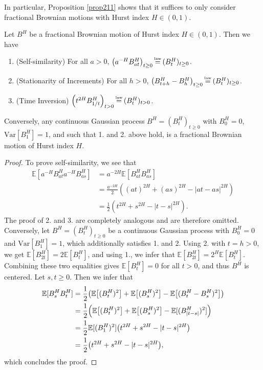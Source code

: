 In particular, Proposition \ref{prop211} shows that it suffices to only consider fractional Brownian motions with Hurst index $H\in (0,1)$.
 \begin{prop}\label{prop212}
     Let $B^{H}$ be a fractional Brownian motion of Hurst index $H\in (0,1)$. Then we have
     \begin{enumerate}
         \item (Self-similarity) For all $a>0$, $\left(a^{-H}B^{H}_{at}\right)_{t\geq 0}\mylaw(B_{t}^{H})_{t\geq 0}$.
         \item (Stationarity of Increments) For all $h>0$, $\left(B_{t+h}^{H}-B_{h}^{H}\right)_{t\geq 0}\mylaw (B_{t}^{H})_{t\geq 0}$.
         \item (Time Inversion) $\left(t^{2H}B^{H}_{1/t}\right)_{t>0}\mylaw (B_{t}^{H})_{t>0}$.
     \end{enumerate}
     Conversely, any continuous Gaussian process $B^{H}=(B_{t}^{H})_{t\geq 0}$ with $B_{0}^{H}=0$, $\textrm{Var}[B_{1}^{H}]=1$, and such that 1. and 2. above hold, is a fractional Brownian motion of Hurst index $H$.
 \end{prop}
 \begin{proof}
 To prove self-similarity, we see that
     \begin{align}
         \mathbb{E}\left[a^{-H}B_{at}^{H}a^{-H}B_{as}^{H}\right]&=a^{-2H}\mathbb{E}[B_{at}^{H}B_{as}^{H}]\\
         &=\frac{a^{-2H}}{2}\left((at)^{2H}+(as)^{2H}-|at-as|^{2H}\right)\\
         &= \frac{1}{2}(t^{2H}+s^{2H}-|t-s|^{2H}).
     \end{align}
     The proof of 2. and 3. are completely analogous and are therefore omitted. Conversely, let $B^{H}=(B_{t}^{H})_{t\geq 0}$ be a continuous Gaussian process with $B^{H}_{0}=0$ and $\textrm{Var}[B_{1}^{H}]=1$, which additionally satisfies 1. and 2. Using 2. with $t=h>0$, we get $\mathbb{E}[B_{2t}^{H}]=2\mathbb{E}[B_{t}^{H}]$, and using 1., we infer that $\mathbb{E}[B_{2t}^{H}]=2^{H}\mathbb{E}[B_{t}^{H}]$. Combining these two equalities gives $\mathbb{E}[B_{t}^{H}]=0$ for all $t>0$, and thus $B^{H}$ is centered. Let $s,t\geq 0$. Then we infer that
     \begin{align}
         \E[B_{s}^{H}B_{t}^{H}]&=\frac{1}{2}\left(\E\left[(B_{t}^{H})^{2}\right]+\E\left[(B_{s}^{H})^{2}\right]-\E\left[(B_{t}^{H}-B_{s}^{H})^{2}\right]\right)\\
         &= \frac{1}{2}\left(\E\left[(B_{t}^{H})^{2}\right]+\E\left[(B_{s}^{H})^{2}\right]-\E[(B_{|t-s|}^{H})^{2}]\right)\\
         &= \frac{1}{2}\E[(B_{1}^{H})^{2}]\left(t^{2H}+s^{2H}-|t-s|^{2H}\right)\\
         &= \frac{1}{2}\left(t^{2H}+s^{2H}-|t-s|^{2H}\right),
     \end{align}
     which concludes the proof.
 \end{proof}
